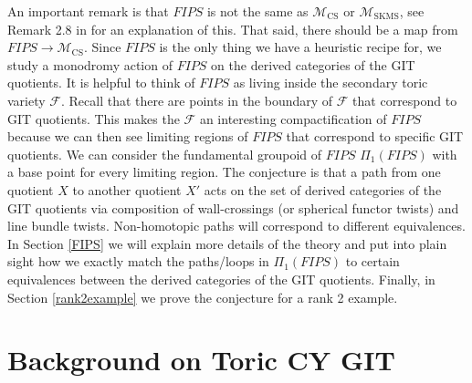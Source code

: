 \documentclass[oneside]{amsart}
\theoremstyle{definition}
\theoremstyle{definition}
\theoremstyle{definition}
\theoremstyle{definition}
\newcommand{\Fs}{\mathcal{F}}
\begin{document}
\newline 
An important remark is that $FIPS$ is not the same as $\mathcal{M}_{\text{CS}}$ or $\mathcal{M}_{\text{SKMS}}$, see Remark 2.8 in \cite{edwill} for an explanation of this. That said, there should be a map from $FIPS \to \mathcal{M}_{\text{CS}}$. Since $FIPS$ is the only thing we have a heuristic recipe for, we study a monodromy action of $FIPS$ on the derived categories of the GIT quotients. It is helpful to think of $FIPS$ as living inside the secondary toric variety $\Fs$. Recall that there are points in the boundary of $\Fs$ that correspond to GIT quotients. This makes the $\Fs$ an interesting compactification of $FIPS$ because we can then see limiting regions of $FIPS$ that correspond to specific GIT quotients. We can consider the fundamental groupoid of $FIPS$ $\Pi_1(FIPS)$ with a base point for every limiting region. The conjecture is that a path from one quotient $X$ to another quotient $X'$ acts on the set of derived categories of the GIT quotients via composition of wall-crossings (or spherical functor twists) and line bundle twists. Non-homotopic paths will correspond to different equivalences. \\
\newline
In Section \ref{FIPS} we will explain more details of the theory and put into plain sight how we exactly match the paths/loops in $\Pi_1(FIPS)$ to certain equivalences between the derived categories of the GIT quotients. Finally, in Section \ref{rank2example} we prove the conjecture for a rank 2 example. 

\section{Background on Toric CY GIT}
\label{background}
\end{document}
